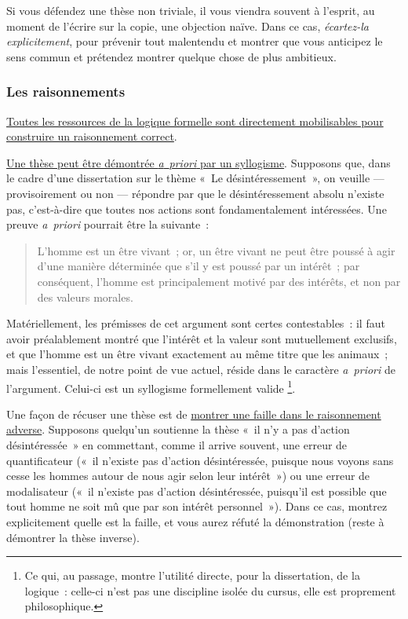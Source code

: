 \documentclass[a4paper,12pt]{article}
\begin{document}
Si vous défendez une thèse non triviale, il vous viendra souvent à
l'esprit, au moment de l'écrire sur la copie, une objection naïve. Dans
ce cas, \emph{écartez-la explicitement}, pour prévenir tout malentendu et
montrer que vous anticipez le sens commun et prétendez montrer quelque
chose de plus ambitieux.


\subsubsection{Les raisonnements}
\label{sec-3-2-1}

\uline{Toutes les ressources de la logique formelle sont directement
mobilisables pour construire un raisonnement correct}.

\uline{Une thèse peut être démontrée \emph{a} \emph{priori} par un syllogisme}.
Supposons que, dans le cadre d'une dissertation sur le thème « Le
désintéressement », on veuille --- provisoirement ou non --- répondre
par que le désintéressement absolu n'existe pas, c'est-à-dire que toutes
nos actions sont fondamentalement intéressées. Une preuve \emph{a priori}
pourrait être la suivante :
\begin{quote}
L'homme est un être vivant ; or, un être vivant ne peut être poussé à
agir d'une manière déterminée que s'il y est poussé par un intérêt ;
par conséquent, l'homme est principalement motivé par des intérêts, et
non par des valeurs morales.
\end{quote}
Matériellement, les prémisses de cet argument sont certes contestables :
il faut avoir préalablement montré que l'intérêt et la valeur sont
mutuellement exclusifs, et que l'homme est un être vivant exactement au
même titre que les animaux ; mais l'essentiel, de notre point de vue
actuel, réside dans le caractère \emph{a priori} de l'argument. Celui-ci est
un syllogisme formellement valide \footnote{Ce qui, au passage, montre l'utilité directe, pour la dissertation,
de la logique : celle-ci n'est pas une discipline isolée du cursus,
elle est proprement philosophique.}.

Une façon de récuser une thèse est de \uline{montrer une faille dans le
raisonnement adverse}. Supposons quelqu'un soutienne la thèse « il n'y a
pas d'action désintéressée » en commettant, comme il arrive souvent, une
erreur de quantificateur (« il n'existe pas d'action désintéressée,
puisque nous voyons sans cesse les hommes autour de nous agir selon leur
intérêt ») ou une erreur de modalisateur (« il n'existe pas d'action
désintéressée, puisqu'il est possible que tout homme ne soit mû que par
son intérêt personnel »). Dans ce cas, montrez explicitement quelle est
la faille, et vous aurez réfuté la démonstration (reste à démontrer la
thèse inverse).
\end{document}
